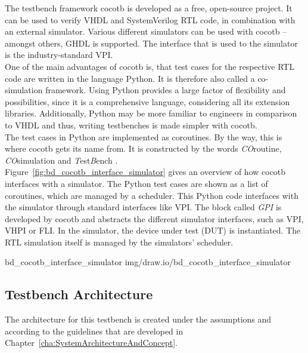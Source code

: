 The testbench framework cocotb is developed as a free, open-source project.
It can be used to verify VHDL and SystemVerilog RTL code, in combination with an external simulator.
Various different simulators can be used with cocotb -- amongst others, GHDL is supported.
The interface that is used to the simulator is the industry-standard VPI.\\

One of the main advantages of cocotb is, that test cases for the respective RTL code are written in the language Python.
It is therefore also called a co-simulation framework.
Using Python provides a large factor of flexibility and possibilities, since it is a comprehensive language, considering all its extension libraries.
Additionally, Python may be more familiar to engineers in comparison to VHDL and thus, writing testbenches is made simpler with cocotb.\\

The test cases in Python are implemented as coroutines.
By the way, this is where cocotb gets its name from.
It is constructed by the words \textit{CO}routine, \textit{CO}simulation and \textit{T}est\textit{B}ench \cite{cocotbDoc}.\\

Figure~\ref{fig:bd_cocotb_interface_simulator} gives an overview of how cocotb interfaces with a simulator.
The Python test cases are shown as a list of coroutines, which are managed by a scheduler.
This Python code interfaces with the simulator through standard interfaces like VPI.
The block called \textit{GPI} is developed by cocotb and abstracts the different simulator interfaces, such as VPI, VHPI or FLI.
In the simulator, the device under test (DUT) is instantiated.
The RTL simulation itself is managed by the simulators' scheduler.

 {bd_cocotb_interface_simulator} {img/draw.io/bd_cocotb_interface_simulator}

\subsection{Testbench Architecture}
\label{sub:VHDL:TestbenchArchitecture}

The architecture for this testbench is created under the assumptions and according to the guidelines that are developed in Chapter~\ref{cha:SystemArchitectureAndConcept}.\\

